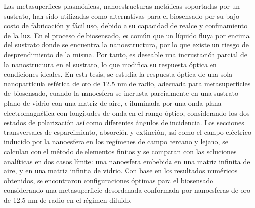 \begin{abstracts}
Las metasuperfices plasmónicas, nanoestructuras metálicas soportadas por un sustrato, han sido utilizadas como alternativas para el biosensado por su bajo costo de fabricación y fácil uso, debido a su capacidad de realce y confinamiento de la luz. En el proceso de biosensado, es común que un líquido fluya por encima del sustrato donde se encuentra la nanoestructura, por lo que existe un riesgo de desprendimiento de la misma. Por tanto, es deseable una incrustación parcial de la nanostructura en el sustrato, lo que modifica su respuesta óptica en condiciones ideales. En esta tesis, se estudia la respuesta óptica de una sola nanopartícula esférica de oro de 12.5 nm de radio, adecuada para metasuperficies de biosensado, cuando la nanoesfera se incrusta parcialmente en una sustrato plano de vidrio con una matriz de aire, e iluminada por una onda plana electromagnética con longitudes de onda en el rango óptico, considerando los dos estados de polarización así como diferentes ángulos de incidencia. Las secciones transversales de esparcimiento, absorción y extinción, así como el campo eléctrico inducido por la nanoesfera en los regímenes de campo cercano y lejano, se calculan con el método de elementos finitos y se comparan con las soluciones analíticas en dos casos límite: una nanoesfera embebida en una matriz infinita de aire, y en una matriz infinita de vidrio. Con base en los resultados numéricos obtenidos, se encontraron configuraciones óptimas para el biosensado considerando una metasuperficie desordenada conformada por nanoesferas de oro de 12.5 nm de radio en el régimen diluido.



\end{abstracts}


